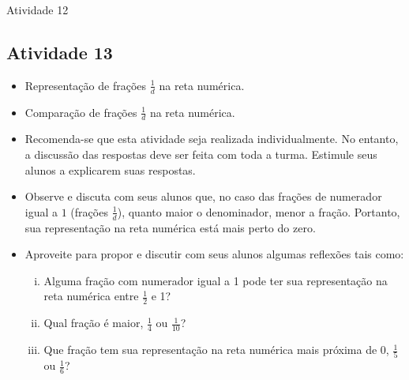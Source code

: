 \begin{multicols}{2}
\begin{resposta*}{Atividade 12}


\end{resposta*}


\subsection{Atividade 13}


  \begin{itemize}
   \item Representação de frações $\frac{1}{d}$ na reta numérica.
   \item Comparação de frações $\frac{1}{d}$ na reta numérica.
  \end{itemize}
 

   \begin{itemize} 
    \item Recomenda-se que esta atividade seja realizada individualmente. No entanto, a discussão das respostas deve ser feita com toda a turma. Estimule seus alunos a explicarem suas respostas.
   \item  Observe e discuta com seus alunos que, no caso das frações de numerador igual a $1$ (frações $\frac{1}{d}$), quanto maior o denominador, menor a fração. Portanto, sua representação na reta numérica está mais perto do zero. 
   \item  Aproveite para propor e discutir com seus alunos algumas reflexões tais como: 
   \begin{enumerate}[(i)]
    \item Alguma fração com numerador igual a 1 pode ter sua representação na reta numérica entre $\frac{1}{2}$ e 1?
    \item Qual fração é maior, $\frac{1}{4}$ ou $\frac{1}{10}$?  
    \item Que fração tem sua representação na reta numérica mais próxima de 0, $\frac{1}{5}$ ou $\frac{1}{6}$?
   \end{enumerate}
 

\end{itemize}
\end{multicols}
